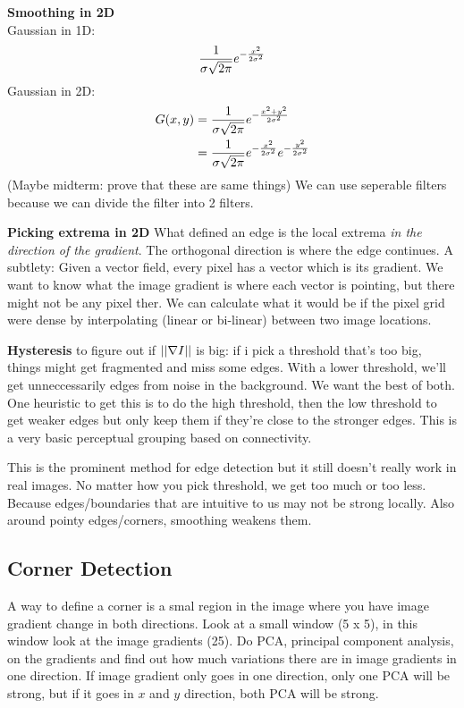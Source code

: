 \textbf{Smoothing in 2D}\\
Gaussian in 1D: $$\frac{1}{\sigma \sqrt{2\pi}}e^{-\frac{x^2}{2\sigma^2}}$$
Gaussian in 2D: 
\begin{align*}
G(x,y) &= \frac{1}{\sigma \sqrt{2\pi}}e^{-\frac{x^2+y^2}{2\sigma^2}}\\
&= \frac{1}{\sigma \sqrt{2\pi}}e^{-\frac{x^2}{2\sigma^2}} e^{-\frac{y^2}{2\sigma^2}}\\
\end{align*}
(Maybe midterm: prove that these are same things)
We can use seperable filters because we can divide the filter into 2 filters.

\textbf{Picking extrema in 2D}
What defined an edge is the local extrema \emph{in the direction of
  the gradient}. The orthogonal direction is where the edge
continues. A subtlety: Given a vector field, every pixel has a vector which is its
gradient. We want to know what the image gradient is where each vector
is pointing, but there might not be any pixel ther. We can calculate
what it would be if the pixel grid were dense by interpolating (linear
or bi-linear) between two image locations.

\textbf{Hysteresis} to figure out if $||\nabla I||$ is big: if i pick a threshold that's too big, things
might get fragmented and miss some edges. With a lower threshold,
we'll get unneccessarily edges from noise in the background. We want
the best of both. One heuristic to get this is to do the high
threshold, then the low threshold to get weaker edges but only keep
them if they're close to the stronger edges.
This is a very basic perceptual grouping based on connectivity.

This is the prominent method for edge detection but it still doesn't really work in real images. No matter how you pick threshold,
we get too much or too less. Because edges/boundaries that are
intuitive to us may not be strong locally. Also around pointy edges/corners,
smoothing weakens them.

\subsection{Corner Detection}
\label{sec:corner-detection}
A way to define a corner is a smal region in the image where you have
image gradient change in both directions. Look at a small window (5 x
5), in this window look at the image gradients (25). Do PCA, principal
component analysis, on the gradients and find out how much variations
there are in image gradients in one direction. If image gradient only
goes in one direction, only one PCA will be strong, but if it
goes in $x$ and $y$ direction, both PCA will be strong.

